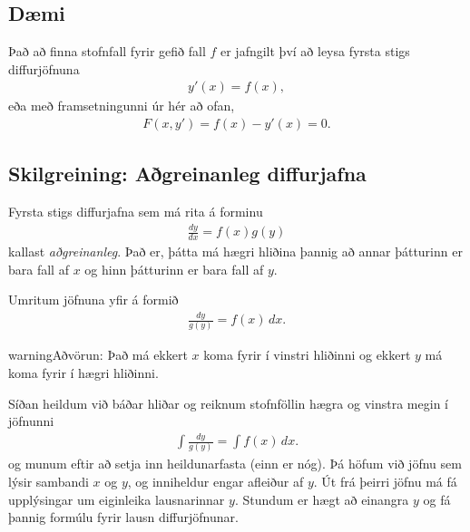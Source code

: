 \documentclass[a4paper,10pt,icelandic]{sphinxmanual}
\begin{document}
\subsection{Dæmi}
\label{kafli08:daemi}
Það að finna stofnfall fyrir gefið fall \(f\) er jafngilt því að leysa
fyrsta stigs diffurjöfnuna
\begin{equation*}
\begin{split}y'(x) = f(x),\end{split}
\end{equation*}
eða með framsetningunni úr {\hyperref[kafli08:diffurjafna]{}} hér
að ofan,
\begin{equation*}
\begin{split}F(x,y') = f(x) - y'(x) = 0.\end{split}
\end{equation*}

\subsection{Skilgreining: Aðgreinanleg diffurjafna}
\label{kafli08:skilgreining-agreinanleg-diffurjafna}\label{kafli08:index-1}
Fyrsta stigs diffurjafna sem má rita á forminu
\begin{equation*}
\begin{split}\frac{dy}{dx}=f(x)g(y)\end{split}
\end{equation*}
kallast \emph{aðgreinanleg}. Það er, þátta má hægri hliðina
þannig að annar þátturinn er bara fall af \(x\) og hinn þátturinn er
bara fall af \(y\).

Umritum jöfnuna yfir á formið
\begin{equation*}
\begin{split}\frac{dy}{g(y)}=f(x)\,dx.\end{split}
\end{equation*}
\begin{notice}{warning}{Aðvörun:}
Það má ekkert \(x\) koma fyrir í vinstri hliðinni og
ekkert \(y\) má koma fyrir í hægri hliðinni.
\end{notice}

Síðan heildum við báðar hliðar og reiknum stofnföllin hægra og vinstra
megin í jöfnunni
\begin{equation*}
\begin{split}\int\frac{dy}{g(y)}=\int f(x)\,dx.\end{split}
\end{equation*}
og munum eftir að setja inn heildunarfasta (einn er nóg). Þá höfum við
jöfnu sem lýsir sambandi \(x\) og \(y\), og inniheldur engar
afleiður af \(y\). Út frá þeirri jöfnu má fá upplýsingar um
eiginleika lausnarinnar \(y\). Stundum er hægt að einangra \(y\)
og fá þannig formúlu fyrir lausn diffurjöfnunar.
\end{document}
